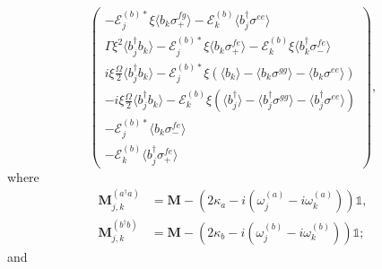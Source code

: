 \documentclass{article}
\begin{document}
\begin{subequations}
\begin{equation}
\begin{pmatrix}
			-\mathcal{E}_{j}^{(b) *} \xi \langle b_{k} \sigma^{fg}_{+} \rangle - \mathcal{E}_{k}^{(b)} \langle b^{\dagger}_{j} \sigma^{ee} \rangle \\
			\Gamma \xi^{2} \langle b^{\dagger}_{j} b_{k} \rangle - \mathcal{E}_{j}^{(b) *} \xi \langle b_{k} \sigma^{fe}_{+} \rangle - \mathcal{E}_{k}^{(b)} \xi \langle b^{\dagger}_{k} \sigma^{fe}_{-} \rangle \\
			i \xi \frac{\Omega}{2} \langle b^{\dagger}_{j} b_{k} \rangle - \mathcal{E}_{j}^{(b) *} \xi \left( \langle b_{k} \rangle - \langle b_{k} \sigma^{gg} \rangle - \langle b_{k} \sigma^{ee} \rangle \right) \\
			-i \xi \frac{\Omega}{2} \langle b^{\dagger}_{j} b_{k} \rangle - \mathcal{E}_{k}^{(b)} \xi \left( \langle b^{\dagger}_{j} \rangle - \langle b^{\dagger}_{j} \sigma^{gg} \rangle - \langle b^{\dagger}_{j} \sigma^{ee} \rangle \right) \\
			-\mathcal{E}_{j}^{(b) *} \langle b_{k} \sigma^{fe}_{-} \rangle \\
			-\mathcal{E}_{k}^{(b)} \langle b^{\dagger}_{j} \sigma^{fe}_{+} \rangle
		\end{pmatrix},
	\end{equation}
\end{subequations}
where
\begin{subequations}
	\begin{align}
		\bm{M}_{j, k}^{(a^{\dagger} a)} &= \bm{M} - \left( 2 \kappa_{a} - i \left( \omega_{j}^{(a)} - i \omega_{k}^{(a)} \right) \right) \mathbb{1}, \\
		\bm{M}_{j, k}^{(b^{\dagger} b)} &= \bm{M} - \left( 2 \kappa_{b} - i \left( \omega_{j}^{(b)} - i \omega_{k}^{(b)} \right) \right) \mathbb{1}; 
	\end{align}
\end{subequations}
and
\end{document}
